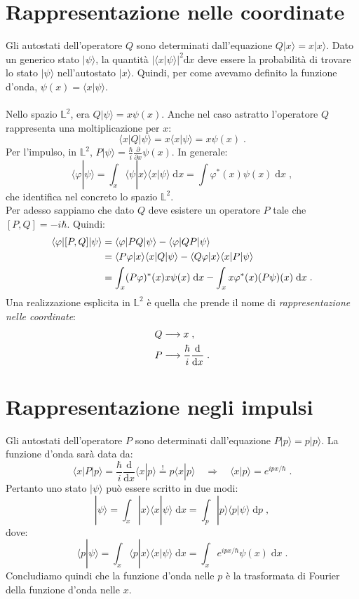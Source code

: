 \documentclass[12pt,a4paper]{report}
\theoremstyle{definition}
\numberwithin{equation}{section}
\newcommand{\diff}[1][]{\mathrm{d}#1}
\newcommand{\bra}{\langle}
\newcommand{\ket}{\rangle}
\begin{document}
\section{Rappresentazione nelle coordinate}
Gli autostati dell'operatore $Q$ sono determinati dall'equazione $Q|x\ket=x|x\ket$. Dato un generico stato $|\psi\ket$, la quantità $|\bra x|\psi\ket|^2\diff{x}$ deve essere la probabilità di trovare lo stato $|\psi\ket$ nell'autostato $|x\ket$.  Quindi, per come avevamo definito la funzione d'onda, $\psi(x)=\bra x|\psi\ket$. \\
\\
Nello spazio $\mathbb{L}^2$, era $Q|\psi\ket=x\psi(x)$. Anche nel caso astratto l'operatore $Q$ rappresenta una moltiplicazione per $x$:
\begin{equation}
\bra x|Q|\psi\ket=x\bra x|\psi\ket=x\psi(x)\;.
\end{equation}
Per l'impulso, in $\mathbb{L}^2$, $P|\psi\ket=\frac{\hbar}{i}\frac{\partial}{\partial x}\psi(x)$. In generale:
\begin{equation}
\bra \varphi|\psi\ket=\int_x \bra\psi|x\ket\bra x|\psi\ket\;\diff{x}=\int \varphi^*(x)\psi(x)\;\diff{x}\;,
\end{equation}
che identifica nel concreto lo spazio $\mathbb{L}^2$. \\
Per adesso sappiamo che dato $Q$ deve esistere un operatore $P$ tale che $[P,Q]=-i\hbar$. Quindi:
\begin{align}
\bra\varphi|[P,Q]|\psi\ket &= \bra\varphi|PQ|\psi\ket-\bra\varphi|QP|\psi\ket \notag \\
&= \bra P\varphi|x\ket\bra x|Q|\psi\ket- \bra Q\varphi|x\ket\bra x|P|\psi\ket \notag \\
&= \int_x (P\varphi)^*(x)x\psi(x)\;\diff{x}-\int_x x\varphi^*(x)(P\psi)(x)\;\diff{x}\;.
\end{align}
Una realizzazione esplicita in $\mathbb{L}^2$ è quella che prende il nome di \textit{rappresentazione nelle coordinate}:
\begin{align}
Q &\longrightarrow x \notag\;, \\
P &\longrightarrow \frac{\hbar}{i}\frac{\diff}{\diff{x}}\;.
\end{align}
\section{Rappresentazione negli impulsi}
Gli autostati dell'operatore $P$ sono determinati dall'equazione $P|p\ket=p|p\ket$. La funzione d'onda sarà data da:
\begin{equation}
\bra x|P|p\ket=\frac{\hbar}{i}\frac{\diff}{\diff{x}}\bra x|p\ket\stackrel{!}{=} p\bra x|p\ket \quad \Longrightarrow \quad \bra x|p\ket=e^{ipx/\hbar}\;.
\end{equation}
Pertanto uno stato $|\psi\ket$ può essere scritto in due modi:
$$
|\psi\ket=\int_x |x\ket\bra x|\psi\ket\;\diff{x}=\int_p |p\ket\bra p|\psi\ket\;\diff{p}\;,
$$
dove:
\begin{equation}
\bra p|\psi\ket=\int_x \bra p|x\ket\bra x|\psi\ket\;\diff{x}=\int_x e^{ipx/\hbar}\psi(x)\;\diff{x}\;.
\end{equation}
Concludiamo quindi che la funzione d'onda nelle $p$ è la trasformata di Fourier della funzione d'onda nelle $x$.
\end{document}
